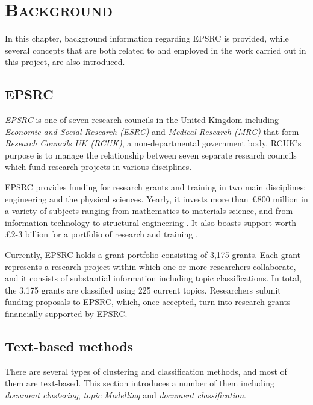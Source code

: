 \chapter{\textsc{Background}}
\label{chapter:background}

In this chapter, background information regarding EPSRC is provided, while several concepts that are both related to and employed in the work carried out in this project, are also introduced.

\section{EPSRC}

\textit{EPSRC} is one of seven research councils in the United Kingdom including \textit{Economic and Social Research (ESRC)} and \textit{Medical Research (MRC)} that form \textit{Research Councils UK (RCUK)}, a non-departmental government body. RCUK's purpose is to manage the relationship between seven separate research councils which fund research projects in various disciplines.

EPSRC provides funding for research grants and training in two main disciplines: engineering and the physical sciences. Yearly, it invests more than \pounds800 million in a variety of subjects ranging from mathematics to materials science, and from information technology to structural engineering \cite{epsrc_about_us}. It also boasts support worth \pounds2-3 billion for a portfolio of research and training \cite{epsrc_our_portfolio}.

Currently, EPSRC holds a grant portfolio consisting of 3,175 grants. Each grant represents a research project within which one or more researchers collaborate, and it consists of substantial information including topic classifications. In total, the 3,175 grants are classified using 225 current topics. Researchers submit funding proposals to EPSRC, which, once accepted, turn into research grants financially supported by EPSRC.

\clearpage

\section{Text-based methods}

There are several types of clustering and classification methods, and most of them are text-based. This section introduces a number of them including \textit{document clustering}, \textit{topic Modelling} and \textit{document classification}.

